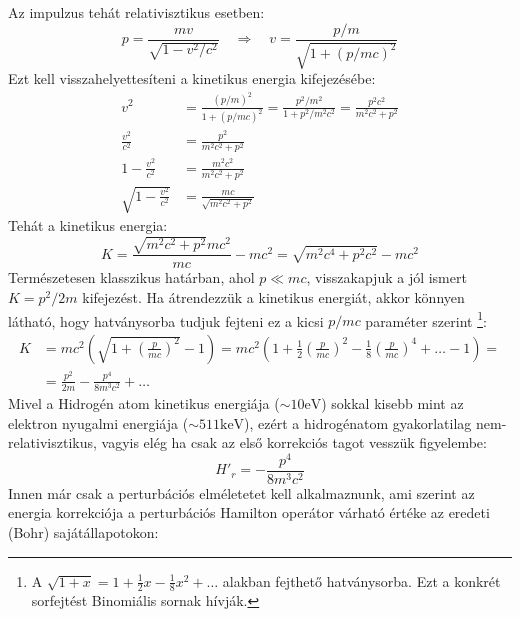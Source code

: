 \documentclass[../main.tex]{subfiles}
\begin{document}
Az impulzus tehát relativisztikus esetben:
\begin{equation}
    p = \frac{m v}{\sqrt{1 - v^2/c^2}} \quad \Rightarrow \quad v = \frac{p/m}{\sqrt{1 + (p/mc)^2}}
\end{equation}
Ezt kell visszahelyettesíteni a kinetikus energia kifejezésébe:
\begin{equation}
    \begin{aligned}
        v^2 &= \frac{(p/m)^2}{1 + (p/mc)^2} = \frac{p^2/m^2}{1 + p^2/m^2 c^2} = \frac{p^2 c^2}{m^2 c^2 + p^2} \\
        \frac{v^2}{c^2} &= \frac{p^2}{m^2 c^2 + p^2} \\
        1 - \frac{v^2}{c^2} &= \frac{m^2 c^2}{m^2 c^2 + p^2} \\
        \sqrt{1 - \frac{v^2}{c^2}} &= \frac{m c}{\sqrt{m^2 c^2 + p^2}}
    \end{aligned}
\end{equation}
Tehát a kinetikus energia:
\begin{equation}
    K = \frac{\sqrt{m^2 c^2 + p^2} mc^2}{mc} - m c^2 = \sqrt{m^2 c^4 + p^2 c^2} - m c^2
\end{equation}
Természetesen klasszikus határban, ahol $p \ll mc$, visszakapjuk a jól ismert $K = p^2/2m$ kifejezést. Ha átrendezzük a kinetikus energiát, akkor könnyen látható, hogy hatványsorba tudjuk fejteni ez a kicsi $p/mc$ paraméter szerint
\footnote{A $\sqrt{1 + x} = 1 + \frac{1}{2} x - \frac{1}{8} x^2 + \ldots$ alakban fejthető hatványsorba. Ezt a konkrét sorfejtést Binomiális sornak hívják.}:
\begin{equation}
    \begin{aligned}
        K &= m c^2 \left( \sqrt{1 + \left(\frac{p}{m c}\right)^2} - 1 \right) = m c^2 \left( 1 + \frac{1}{2} \left(\frac{p}{m c}\right)^2 - \frac{1}{8} \left(\frac{p}{m c}\right)^4 + \ldots - 1 \right) = \\
        &= \frac{p^2}{2m} - \frac{p^4}{8 m^3 c^2} + \ldots
    \end{aligned}
\end{equation}
Mivel a Hidrogén atom kinetikus energiája ($\sim 10 \text{eV}$) sokkal kisebb mint az elektron nyugalmi energiája ($\sim 511 \text{keV}$), ezért a hidrogénatom gyakorlatilag nem-relativisztikus, vagyis elég ha csak az első 
korrekciós tagot vesszük figyelembe:
\begin{equation}
    H'_{r} = - \frac{p^4}{8 m^3 c^2}
\end{equation}
Innen már csak a perturbációs elméletetet kell alkalmaznunk, ami szerint az energia korrekciója a perturbációs Hamilton operátor várható értéke az eredeti (Bohr) sajátállapotokon:
\end{document}
